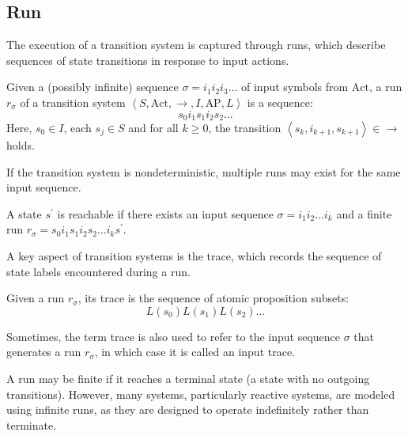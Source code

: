 \subsection{Run}
The execution of a transition system is captured through runs, which describe sequences of state transitions in response to input actions.
\begin{definition}
    Given a (possibly infinite) sequence $\sigma = i_1i_2i_3\dots$ of input symbols from $\text{Act}$, a run $r_\sigma$ of a transition system $\left\langle S,\text{Act},\rightarrow,I,\text{AP},L\right\rangle$ is a sequence: 
    \[s_0i_1s_1i_2s_2\dots\] 
    Here, $s_0\in I$, each $s_j \in S$ and for all $k \geq 0$, the transition $\left\langle s_k, i_{k+1}, s_{k+1}\right\rangle\in\rightarrow$ holds.
\end{definition}
\noindent If the transition system is nondeterministic, multiple runs may exist for the same input sequence.
\begin{definition}
    A state $s^\prime$ is reachable if there exists an input sequence $\sigma = i_1i_2\dots i_k$ and a finite run $r_\sigma = s_0 i_1 s_1 i_2 s_2 \dots i_k s^\prime$.
\end{definition}

\noindent A key aspect of transition systems is the trace, which records the sequence of state labels encountered during a run.
\begin{definition}
    Given a run $r_\sigma$, its trace is the sequence of atomic proposition subsets:
    \[L(s_0) L(s_1) L(s_2)\dots\]
\end{definition}
\noindent Sometimes, the term trace is also used to refer to the input sequence $\sigma$ that generates a run $r_\sigma$, in which case it is called an input trace.

A run may be finite if it reaches a terminal state (a state with no outgoing transitions).
However, many systems, particularly reactive systems, are modeled using infinite runs, as they are designed to operate indefinitely rather than terminate.